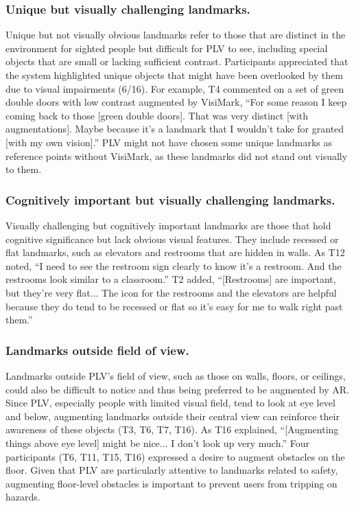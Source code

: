 \subsubsection{Unique but visually challenging landmarks.} 
Unique but not visually obvious landmarks refer to those that are distinct in the environment for sighted people but difficult for PLV to see, including special objects that are small or lacking sufficient contrast. Participants appreciated that the system highlighted unique objects that might have been overlooked by them due to visual impairments (6/16). For example, T4 commented on a set of green double doors with low contrast augmented by VisiMark, ``For some reason I keep coming back to those [green double doors]. That was very distinct [with augmentations]. Maybe because it's a landmark that I wouldn't take for granted [with my own vision].'' PLV might not have chosen some unique landmarks as reference points without VisiMark, as these landmarks did not stand out visually to them.



\subsubsection{Cognitively important but visually challenging landmarks.}
Visually challenging but cognitively important landmarks are those that hold cognitive significance but lack obvious visual features. They include recessed or flat landmarks, such as elevators and restrooms that are hidden in walls. As T12 noted, ``I need to see the restroom sign clearly to know it's a restroom. And the restrooms look similar to a classroom.'' T2 added, ``[Restrooms] are important, but they're very flat... The icon for the restrooms and the elevators are helpful because they do tend to be recessed or flat so it's easy for me to walk right past them.''


\subsubsection{Landmarks outside field of view.}\label{Landmarks outside their central view.} Landmarks outside PLV's field of view, such as those on walls, floors, or ceilings, could also be difficult to notice and thus being preferred to be augmented by AR. %
Since PLV, especially people with limited visual field, tend to look at eye level and below, augmenting landmarks outside their central view can reinforce their awareness of these objects (T3, T6, T7, T16). As T16 explained, ``[Augmenting things above eye level] might be nice... I don't look up very much.'' Four participants (T6, T11, T15, T16) expressed a desire to augment obstacles on the floor. Given that PLV are particularly attentive to landmarks related to safety, augmenting floor-level obstacles is important to prevent users from tripping on hazards.



